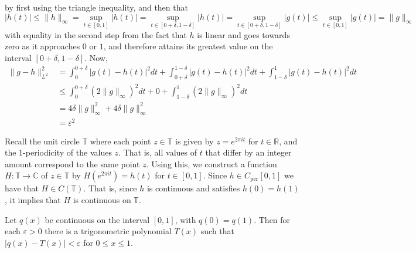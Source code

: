 \documentclass[../thesis.tex]{subfiles}
\begin{document}
by first using the triangle inequality, and then that
\begin{equation*}
    |h(t)| \leq \|h\|_{\infty} = \sup_{t\in[0,1]} |h(t)| = \sup_{t\in[0+\delta, 1-\delta]} |h(t)| = \sup_{t\in[0+\delta, 1-\delta]} |g(t)| \leq \sup_{t\in[0, 1]} |g(t)| =\| g\|_{\infty}
\end{equation*}
with equality in the second step from the fact that $h$ is linear and goes towards zero as it approaches $0$ or $1$, and therefore attains its greatest value on the interval $[0+\delta,1-\delta]$. Now,
\begin{align*}
    \| g-h \|_{L^2}^2 &=  \int_0^{0+\delta} \left|g(t)-h(t) \right|^2dt + \int_{0+\delta}^{1-\delta} \left|g(t)-h(t) \right|^2dt +\int_{1-\delta}^{1} \left|g(t)-h(t) \right|^2dt\\ 
    &\leq \int_0^{0+\delta} (2 \| g\|_\infty)^2dt + 0 +\int_{1-\delta}^{1} (2 \| g\|_\infty)^2dt\\
    &=  4 \delta \| g\|_\infty^2 + 4 \delta \| g\|_\infty^2\\ 
    &= \varepsilon^2
\end{align*}

Recall the unit circle $\mathbb{T}$ where each point $z \in \mathbb{T}$ is given by $z= e^{2\pi i t}$ for $t \in \mathbb{R}$, and the 1-periodicity of the values $z$.  That is, all values of $t$ that differ by an integer amount correspond to the same point $z$. Using this, we construct a function $H: \mathbb{T} \longrightarrow \mathbb{C}$ of  $z\in\mathbb{T}$ by $H(e^{2 \pi i t})=h(t)$ for $t\in[0,1]$. Since $h \in C_{\text{per}}[0,1]$ we have that $H \in C(\mathbb{T})$. That is, since $h$ is continuous and satisfies $h(0) = h(1)$, it implies that $H$ is continuous on $\mathbb{T}$.
\begin{theorem}
    Let $q(x)$ be continuous on the interval $[0, 1]$, with $q(0)=q(1)$. Then for each $\varepsilon>0$ there is a trigonometric polynomial $T(x)$ such that $|q(x)-T(x)|<\varepsilon$ for $0 \leq x \leq 1$.
\end{theorem}
\end{document}

